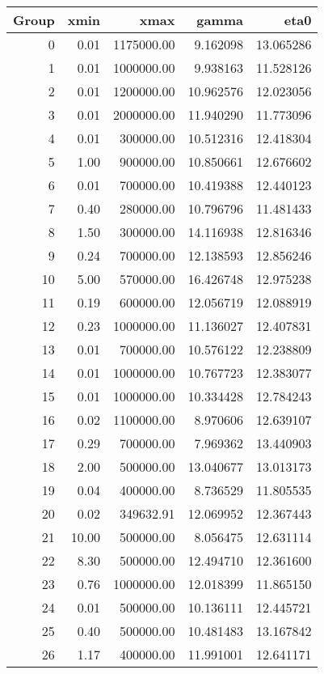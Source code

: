 \begin{tabular}{rrrrr}
\toprule
 Group &   xmin &        xmax &      gamma &       eta0 \\
\midrule
     0 &   0.01 &  1175000.00 &   9.162098 &  13.065286 \\
     1 &   0.01 &  1000000.00 &   9.938163 &  11.528126 \\
     2 &   0.01 &  1200000.00 &  10.962576 &  12.023056 \\
     3 &   0.01 &  2000000.00 &  11.940290 &  11.773096 \\
     4 &   0.01 &   300000.00 &  10.512316 &  12.418304 \\
     5 &   1.00 &   900000.00 &  10.850661 &  12.676602 \\
     6 &   0.01 &   700000.00 &  10.419388 &  12.440123 \\
     7 &   0.40 &   280000.00 &  10.796796 &  11.481433 \\
     8 &   1.50 &   300000.00 &  14.116938 &  12.816346 \\
     9 &   0.24 &   700000.00 &  12.138593 &  12.856246 \\
    10 &   5.00 &   570000.00 &  16.426748 &  12.975238 \\
    11 &   0.19 &   600000.00 &  12.056719 &  12.088919 \\
    12 &   0.23 &  1000000.00 &  11.136027 &  12.407831 \\
    13 &   0.01 &   700000.00 &  10.576122 &  12.238809 \\
    14 &   0.01 &  1000000.00 &  10.767723 &  12.383077 \\
    15 &   0.01 &  1000000.00 &  10.334428 &  12.784243 \\
    16 &   0.02 &  1100000.00 &   8.970606 &  12.639107 \\
    17 &   0.29 &   700000.00 &   7.969362 &  13.440903 \\
    18 &   2.00 &   500000.00 &  13.040677 &  13.013173 \\
    19 &   0.04 &   400000.00 &   8.736529 &  11.805535 \\
    20 &   0.02 &   349632.91 &  12.069952 &  12.367443 \\
    21 &  10.00 &   500000.00 &   8.056475 &  12.631114 \\
    22 &   8.30 &   500000.00 &  12.494710 &  12.361600 \\
    23 &   0.76 &  1000000.00 &  12.018399 &  11.865150 \\
    24 &   0.01 &   500000.00 &  10.136111 &  12.445721 \\
    25 &   0.40 &   500000.00 &  10.481483 &  13.167842 \\
    26 &   1.17 &   400000.00 &  11.991001 &  12.641171 \\
\bottomrule
\end{tabular}
